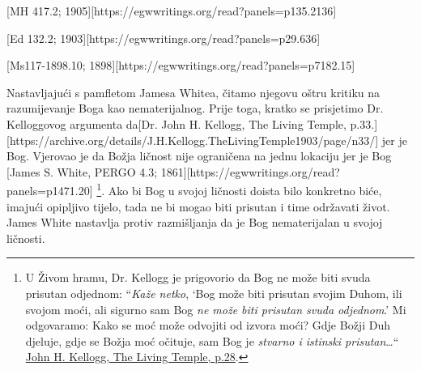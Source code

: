 [MH 417.2; 1905][https://egwwritings.org/read?panels=p135.2136]

[Ed 132.2; 1903][https://egwwritings.org/read?panels=p29.636]

[Ms117-1898.10; 1898][https://egwwritings.org/read?panels=p7182.15]

Nastavljajući s pamfletom Jamesa Whitea, čitamo njegovu oštru kritiku na razumijevanje Boga kao nematerijalnog. Prije toga, kratko se prisjetimo Dr. Kelloggovog argumenta da[Dr. John H. Kellogg, The Living Temple, p.33.][https://archive.org/details/J.H.Kellogg.TheLivingTemple1903/page/n33/] jer je Bog. Vjerovao je da Božja ličnost nije ograničena na jednu lokaciju jer je Bog [James S. White, PERGO 4.3; 1861][https://egwwritings.org/read?panels=p1471.20] \footnote{U Živom hramu, Dr. Kellogg je prigovorio da Bog ne može biti svuda prisutan odjednom: “\textit{Kaže netko}, ‘Bog može biti prisutan svojim Duhom, ili svojom moći, ali sigurno sam Bog \textit{ne može biti prisutan svuda odjednom}.’ Mi odgovaramo: Kako se moć može odvojiti od izvora moći? Gdje Božji Duh djeluje, gdje se Božja moć očituje, sam Bog je \textit{stvarno i istinski prisutan}…“ \href{https://archive.org/details/J.H.Kellogg.TheLivingTemple1903/page/n29/}{John H. Kellogg, The Living Temple, p.28}.}. Ako bi Bog u svojoj ličnosti doista bilo konkretno biće, imajući opipljivo tijelo, tada ne bi mogao biti prisutan  i time održavati život. James White nastavlja protiv razmišljanja da je Bog nematerijalan u svojoj ličnosti.

